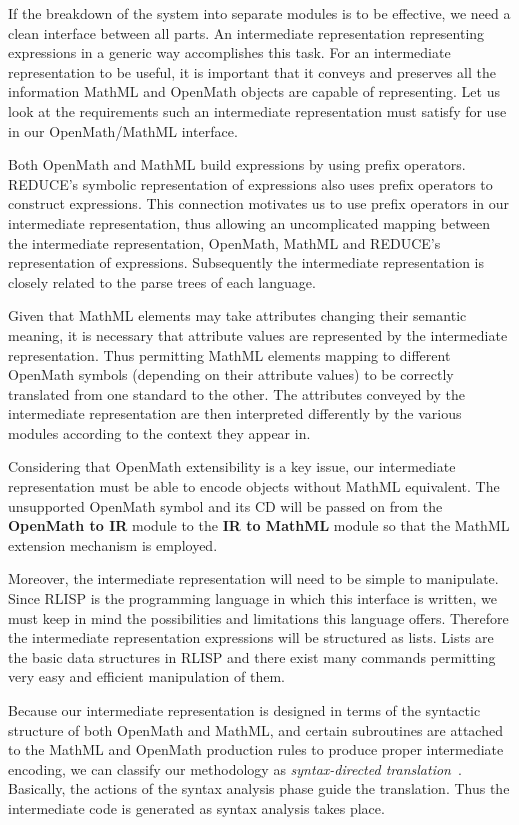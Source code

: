 If the breakdown of the system into separate modules is to be effective, we need a clean interface between all parts. An intermediate
representation representing expressions in a generic way accomplishes this task. For an intermediate representation to be useful, it is important
that it conveys and preserves all the information MathML and OpenMath objects are capable of representing. Let us look at the requirements such an
intermediate representation must satisfy for use in our OpenMath/MathML interface.

Both OpenMath and MathML build expressions by using prefix operators. REDUCE's symbolic representation of expressions also uses prefix operators to
construct expressions. This connection motivates us to use prefix operators in our intermediate representation, thus allowing an uncomplicated
mapping between the intermediate representation, OpenMath, MathML and REDUCE's representation of expressions. Subsequently the intermediate
representation is closely related to the parse trees of each language.

Given that MathML elements may take attributes changing their semantic meaning, it is necessary that attribute values are represented by the
intermediate representation. Thus permitting MathML elements mapping to different OpenMath symbols (depending on their attribute values) to be
correctly translated from one standard to the other. The attributes conveyed by the intermediate representation are then interpreted differently by
the various modules according to the context they appear in.

Considering that OpenMath extensibility is a key issue, our intermediate representation must be able to encode objects without MathML equivalent.
The unsupported OpenMath symbol and its CD will be passed on from the {\bf OpenMath to IR} module to the {\bf IR to MathML} module so that the
MathML extension mechanism is employed.

Moreover, the intermediate representation will need to be simple to manipulate. Since RLISP is the programming language in which this interface is
written, we must keep in mind the possibilities and limitations this language offers. Therefore the intermediate representation expressions will be
structured as lists. Lists are the basic data structures in RLISP and there exist many commands permitting very easy and efficient manipulation of
them.

Because our intermediate representation is designed in terms of the syntactic structure of both OpenMath and MathML, and certain subroutines are
attached to the MathML and OpenMath production rules to produce proper intermediate encoding, we can classify our methodology as {\it
syntax-directed translation}~\cite{compilers}. Basically, the actions of the syntax analysis phase guide the translation. Thus the intermediate
code is generated as syntax analysis takes place.

